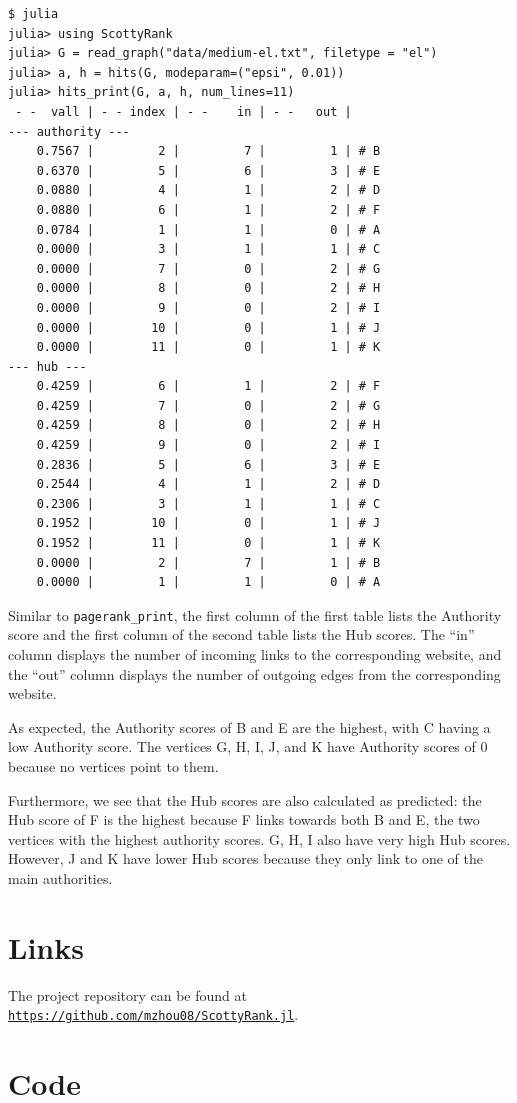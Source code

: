 \documentclass[12pt, titlepage, twoside]{amsart}
\begin{document}
\begin{verbatim}
$ julia
julia> using ScottyRank
julia> G = read_graph("data/medium-el.txt", filetype = "el")
julia> a, h = hits(G, modeparam=("epsi", 0.01))
julia> hits_print(G, a, h, num_lines=11)
 - -  vall | - - index | - -    in | - -   out |
--- authority ---
    0.7567 |         2 |         7 |         1 | # B
    0.6370 |         5 |         6 |         3 | # E
    0.0880 |         4 |         1 |         2 | # D
    0.0880 |         6 |         1 |         2 | # F
    0.0784 |         1 |         1 |         0 | # A
    0.0000 |         3 |         1 |         1 | # C
    0.0000 |         7 |         0 |         2 | # G
    0.0000 |         8 |         0 |         2 | # H
    0.0000 |         9 |         0 |         2 | # I
    0.0000 |        10 |         0 |         1 | # J
    0.0000 |        11 |         0 |         1 | # K
--- hub ---
    0.4259 |         6 |         1 |         2 | # F
    0.4259 |         7 |         0 |         2 | # G
    0.4259 |         8 |         0 |         2 | # H
    0.4259 |         9 |         0 |         2 | # I
    0.2836 |         5 |         6 |         3 | # E
    0.2544 |         4 |         1 |         2 | # D
    0.2306 |         3 |         1 |         1 | # C
    0.1952 |        10 |         0 |         1 | # J
    0.1952 |        11 |         0 |         1 | # K
    0.0000 |         2 |         7 |         1 | # B
    0.0000 |         1 |         1 |         0 | # A
\end{verbatim}

Similar to \texttt{pagerank_print}, the first column
of the first table lists the Authority score
and the first column of the second table lists the Hub scores.
The ``in'' column displays the number of incoming links to the corresponding website,
and the ``out'' column displays the number of outgoing edges from the corresponding website.

As expected, the Authority scores of B and E are the highest, with C having a low Authority score.
The vertices G, H, I, J, and K have Authority scores of 0 because no vertices point to them.

Furthermore, we see that the Hub scores are also calculated as predicted:
the Hub score of F is the highest because F links towards both B and E,
the two vertices with the highest authority scores. G, H, I also
have very high Hub scores. However, J and K have lower Hub scores because they only link to one of the main authorities.




\appendix

\section{Links}

The project repository can be found at
\href{https://github.com/mzhou08/ScottyRank.jl}{\texttt{https://github.com/mzhou08/ScottyRank.jl}}.

\section{Code}

\inputminted{julia}{../src/ScottyRank.jl}
\end{document}
